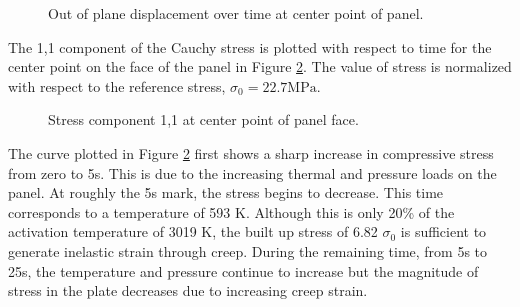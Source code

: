 \documentclass[conf]{new-aiaa}
\begin{document}
\begin{figure}[H]
  \centering
  \caption{ Out of plane displacement over time at center point of panel.}
  \label{fig_panel_displacement_over_time}
\end{figure}

The 1,1 component of the Cauchy stress is plotted with respect to time
for the center point on the face of the panel in Figure \ref{fig_panel_stress_over_time}.
The value of stress is normalized with respect to the reference stress, 
$\sigma_0 = 22.7 \text{MPa}$.

\begin{figure}[H]
  \centering
  \caption{ Stress component 1,1 at center point of panel face.}
  \label{fig_panel_stress_over_time}
\end{figure}

The curve plotted in Figure \ref{fig_panel_stress_over_time} first 
shows a sharp increase in compressive stress from zero to 5s.
This is due to the increasing thermal and pressure loads on the panel.
At roughly the 5s mark, the stress begins to decrease. 
This time corresponds to a temperature of 593 K. 
Although this is only 20\% of the activation temperature of 3019 K,
the built up stress of 6.82 $\sigma_0$ is sufficient to generate 
inelastic strain through creep.
During the remaining time, from 5s to 25s, the temperature 
and pressure continue to increase but the magnitude of stress in the plate
decreases due to increasing creep strain.
\end{document}
